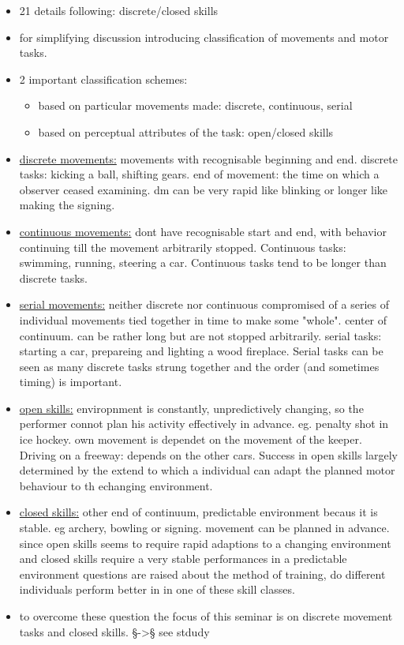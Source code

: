 	\begin{itemize}
		\item 21 details following: discrete/closed skills
		\item for simplifying discussion introducing classification of movements and motor tasks.
		\item 2 important classification schemes:
		\begin{itemize}
			\item based on particular movements made: discrete, continuous, serial
			\item based on perceptual attributes of the task: open/closed skills
		\end{itemize}
		\item \underline{discrete movements:} movements with recognisable beginning and end. discrete tasks: kicking a ball, shifting gears. end of movement: the time on which a observer ceased examining. dm can be very rapid like blinking or longer like making the signing.
		\item \underline{continuous movements:} dont have recognisable start and end, with behavior continuing till the movement arbitrarily stopped. Continuous tasks: swimming, running, steering a car. Continuous tasks tend to be longer than discrete tasks.
		\item \underline{serial movements:} neither discrete nor continuous compromised of a series of individual movements tied together in time to make some "whole". center of continuum. can be rather long but are not stopped arbitrarily. serial tasks: starting a car, prepareing and lighting a wood fireplace. Serial tasks can be seen as many discrete tasks strung together and the order (and sometimes timing) is important.
		\item \underline{open skills:} enviropnment is constantly, unpredictively changing, so the performer connot plan his activity effectively in advance. eg. penalty shot in ice hockey. own movement is dependet on the movement of the keeper. Driving on a freeway: depends on the other cars. Success in open skills largely determined by the extend to which a individual can adapt the planned motor behaviour  to th echanging environment.
		\item \underline{closed skills:} other end of continuum, predictable environment becaus it is stable. eg archery, bowling or signing. movement can be planned in advance.
		since open skills  seems to require rapid adaptions to a changing environment and closed skills require a very stable performances in a predictable environment questions are raised about the method of training, do different individuals perform better in in one of these skill classes. 
		\item to overcome these question the focus of this seminar is on discrete movement tasks and closed skills. §->§ see stdudy
	\end{itemize}
